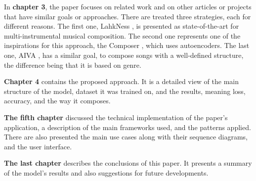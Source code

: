 In \textbf{chapter 3},
the paper focuses on related work and on other articles or projects
that have similar goals or approaches. There are treated three strategies,
each for different reasons. The first one, LahkNess \cite{donahue2019lakhnes},
is presented as state-of-the-art for multi-instrumental musical composition.
The second one represents one of the inspirations for this approach, the Composer \cite{hackerPoet},
which uses autoencoders. The last one, AIVA \cite{aiva}, has a similar goal,
to compose songs with a well-defined structure,
the difference being that it is based on genre.

\textbf{Chapter 4} contains the proposed approach.
It is a detailed view of the main structure of the model,
dataset it was trained on, and the results, meaning loss, accuracy,
and the way it composes.

\textbf{The fifth chapter} discussed the technical
implementation of the paper's application,
a description of the main frameworks used,
and the patterns applied.
There are also presented the main use cases along with their sequence diagrams,
and the user interface.

\textbf{The last chapter} describes the conclusions of this paper.
It presents a summary of the model's
results and also suggestions for future developments.
